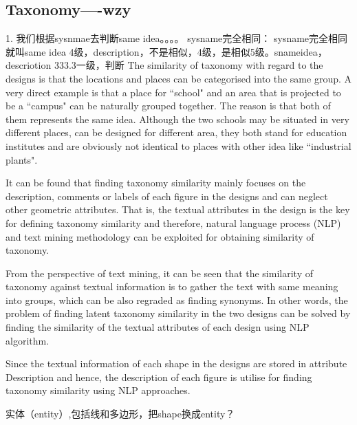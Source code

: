 \subsection*{Taxonomy----wzy}
1. 我们根据sysnmae去判断same idea。。。。 sysname完全相同： sysname完全相同就叫same idea 4级，description，不是相似，4级，是相似5级。snameidea， descriotion   333.3一级，判断
The similarity of taxonomy with regard to the designs is that the locations and places can be categorised into the same group. A very direct example is that a place for ``school" and an area that is projected to be a ``campus" can be naturally grouped together. The reason is that both of them represents the same idea. Although the two schools may be situated in very different places, can be designed for different area, they both stand for education institutes and are obviously not identical to places with other idea like ``industrial plants".
\par
It can be found that finding taxonomy similarity mainly focuses on the description, comments or labels of each figure in the designs and can neglect other geometric attributes. That is, the textual attributes in the design is the key for defining taxonomy similarity and therefore, natural language process (NLP) and text mining methodology can be exploited for obtaining similarity of taxonomy.
\par
From the perspective of text mining, it can be seen that the similarity of taxonomy against textual information is to gather the text with same meaning into groups, which can be also regraded as finding synonyms. In other words, the problem of finding latent taxonomy similarity in the two designs can be solved by finding the similarity of the textual attributes of each design using NLP algorithm.
\par
Since the textual information of each shape in the designs are stored in attribute Description and hence, the description of each figure is utilise for finding taxonomy similarity using NLP approaches. 

实体（entity）,包括线和多边形，把shape换成entity？


